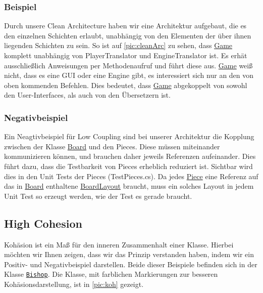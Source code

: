 \documentclass[
10pt, %
a4paper, %
oneside, %
headinclude,footinclude, %
BCOR5mm, %
]{scrartcl}
\begin{document}
\begin{onehalfspace}
\subsubsection{Beispiel}
Durch unsere Clean Architecture haben wir eine Architektur aufgebaut, die es den einzelnen Schichten erlaubt, unabhängig von den Elementen der über ihnen liegenden Schichten zu sein. So ist auf \autoref{pic:cleanArc} zu sehen, dass \href{https://github.com/schmida736/Chess-AdvancedSE/blob/main/Chess-AdvancedSE/Game\%20Elements/Game.cs}{Game} komplett unabhängig von PlayerTranslator und EngineTranslator ist. Es erhät ausschließlich Anweisungen per Methodenaufruf und führt diese aus. \href{https://github.com/schmida736/Chess-AdvancedSE/blob/main/Chess-AdvancedSE/Game\%20Elements/Game.cs}{Game} weiß nicht, dass es eine GUI oder eine Engine gibt, es interessiert sich nur an den von oben kommenden Befehlen. Dies bedeutet, dass \href{https://github.com/schmida736/Chess-AdvancedSE/blob/main/Chess-AdvancedSE/Game\%20Elements/Game.cs}{Game} abgekoppelt von sowohl den User-Interfaces, als auch von den Übersetzern ist.

\subsubsection{Negativbeispiel}
Ein Neagtivbeispiel für Low Coupling sind bei unserer Architektur die Kopplung zwischen der Klasse \href{https://github.com/schmida736/Chess-AdvancedSE/blob/main/Chess-AdvancedSE/Game\%20Elements/Board.cs}{Board} und den Pieces. Diese müssen miteinander kommunizieren können, und brauchen daher jeweils Referenzen aufeinander. Dies führt dazu, dass die Testbarkeit von Pieces erheblich reduziert ist. Sichtbar wird dies in den Unit Tests der Pieces (TestPieces.cs). Da jedes \href{https://github.com/schmida736/Chess-AdvancedSE/blob/main/Chess-AdvancedSE/Game\%20Elements/Pieces/Piece.cs}{Piece} eine Referenz auf das in \href{https://github.com/schmida736/Chess-AdvancedSE/blob/main/Chess-AdvancedSE/Game\%20Elements/Board.cs}{Board} enthaltene \href{https://github.com/schmida736/Chess-AdvancedSE/blob/main/Chess-AdvancedSE/Game\%20Elements/BoardLayout.cs}{BoardLayout} braucht, muss ein solches Layout in jedem Unit Test so erzeugt werden, wie der Test es gerade braucht.

\subsection{High Cohesion}
Kohäsion ist ein Maß für den inneren Zusammenhalt einer Klasse. Hierbei möchten wir Ihnen zeigen, dass wir das Prinzip verstanden haben, indem wir ein Positiv- und Negativbeispiel darstellen. Beide dieser Beispiele befinden sich in der Klasse \texttt{\href{https://github.com/schmida736/Chess-AdvancedSE/blob/main/Chess-AdvancedSE/Game\%20Elements/Pieces/Bishop.cs}{Bishop}}. Die Klasse, mit farblichen Markierungen zur besseren Kohäsionsdarstellung, ist in \autoref{pic:koh} gezeigt.


\end{onehalfspace}
\end{document}
